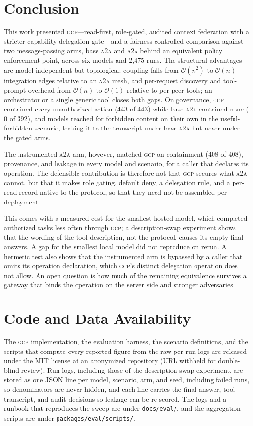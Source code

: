 \documentclass[conference,letterpaper]{IEEEtran}
\newcommand{\gcp}{\textsc{gcp}}
\newcommand{\ata}{\textsc{a2a}}
\newcommand{\bigoh}{\mathcal{O}}
\begin{document}
\section{Conclusion}
This work presented \gcp{}---read-first, role-gated, audited context federation with a
stricter-capability delegation gate---and a fairness-controlled comparison against two message-passing
arms, base \ata{} and \ata{} behind an equivalent policy enforcement point, across six models and
2{,}475 runs. The structural advantages are model-independent but topological: coupling falls from
$\bigoh(n^2)$ to $\bigoh(n)$ integration edges relative to an \ata{} mesh, and per-request discovery and
tool-prompt overhead from $\bigoh(n)$ to $\bigoh(1)$ relative to per-peer tools; an orchestrator or a
single generic tool closes both gaps. On governance, \gcp{} contained every unauthorized action ($443$ of
$443$) while base \ata{} contained none ($0$ of $392$), and models reached for forbidden content on their
own in the useful-forbidden scenario, leaking it to the transcript under base \ata{} but never under
the gated arms.

The instrumented \ata{} arm, however, matched \gcp{} on containment ($408$ of $408$),
provenance, and leakage in every model and scenario, for a caller that declares its operation. The defensible
contribution is therefore not that \gcp{} secures what \ata{} cannot, but that it makes role gating, default deny, a delegation
rule, and a per-read record native to the protocol, so that they need not be assembled per
deployment.

This comes with a measured cost for the smallest hosted model, which completed authorized tasks
less often through \gcp{}; a description-swap experiment shows that the wording of the tool
description, not the protocol, causes its empty final answers. A gap for the smallest local model did
not reproduce on rerun. A hermetic test also shows that the
instrumented arm is bypassed by a caller that omits its operation declaration, which \gcp{}'s distinct
delegation operation does not allow. An open question is how much of the remaining equivalence
survives a gateway that binds the operation on the server side and stronger adversaries.

\section*{Code and Data Availability}
\label{sec:availability}
The \gcp{} implementation, the evaluation harness, the scenario definitions, and the scripts that compute every reported figure from the raw per-run logs are released under the MIT license at
an anonymized repository (URL withheld for double-blind review). Run logs, including those of the description-swap experiment, are stored as one JSON line per model, scenario, arm, and seed, including
failed runs, so denominators are never hidden, and each line carries the final answer, tool
transcript, and audit decisions so leakage can be re-scored. The logs and a runbook that reproduces the sweep are under \texttt{docs/eval/}, and the aggregation scripts are under \texttt{packages/eval/scripts/}.
\end{document}
